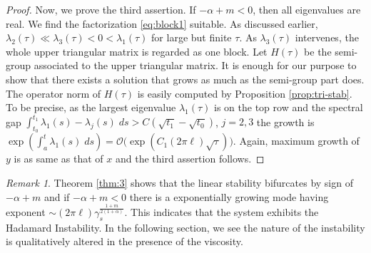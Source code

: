 \documentclass[a4paper,11pt]{article}
\def\l{(2\pi \ell)}
\def\k{(2\pi \ell)}
\theoremstyle{remark}
\newtheorem{remark}{Remark}[section]
\begin{document}
\begin{proof}
Now, we prove the third assertion. If $-\alpha+m < 0$, then all eigenvalues are real. We find the factorization \eqref{eq:block1} suitable. 
As discussed earlier, $\lambda_2(\tau) \ll \lambda_3(\tau) < 0 < \lambda_1(\tau)$ for large but finite $\tau$. As $\lambda_3(\tau)$ intervenes, the whole upper triangular matrix is regarded as one block. Let $H(\tau)$ be the semi-group associated to the upper triangular matrix. It is enough for our purpose to show that there exists a solution that grows as much as the semi-group part does. The operator norm of $H(\tau)$ is easily computed by Proposition \ref{prop:tri-stab}. To be precise, as the largest eigenvalue $\lambda_1(\tau)$ is on the top row and the spectral gap $\int_{t_0}^{t_1} \lambda_1(s)-\lambda_j(s)\; ds > C (\sqrt{t_1}-\sqrt{t_0})$, $j=2,3$ the growth is $\exp\left( \int_a^t \lambda_1(s)\;ds\right)= \mathcal{O}\Big(\exp\left(C_1\k\sqrt{\tau}\right)\Big).$ Again, maximum growth of $y$ is as same as that of $x$ and the third assertion follows.
\end{proof}
\begin{remark}
 Theorem \ref{thm:3} shows that the linear stability bifurcates by sign of $-\alpha+m$ and if $-\alpha+m<0$ there is a exponentially growing mode having exponent $\sim \l \gamma_s^{\frac{1+m}{2(1+\alpha)}}$. This indicates that the system exhibits the Hadamard Instability. In the following section, we see the nature of the instability is qualitatively altered in the presence of the viscosity.
\end{remark}
\end{document}
